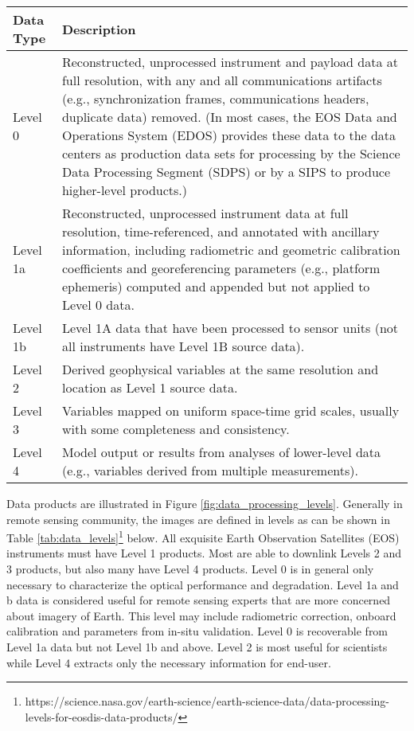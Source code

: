 \begin{table*}[htbp]
	\caption{Data Processing Levels}
	\label{tab:data_levels}
	\centering
		\begin{tabular}{|l |p{12cm}|}
			\hline 															
			Data Type & Description \\
			\hline
			Level 0 & Reconstructed, unprocessed instrument and payload data at full resolution, with any and all communications artifacts (e.g., synchronization frames, communications headers, duplicate data) removed. (In most cases, the EOS Data and Operations System (EDOS) provides these data to the data centers as production data sets for processing by the Science Data Processing Segment (SDPS) or by a SIPS to produce higher-level products.) \\
			\hline
			Level 1a & Reconstructed, unprocessed instrument data at full resolution, time-referenced, and annotated with ancillary information, including radiometric and geometric calibration coefficients and georeferencing parameters (e.g., platform ephemeris) computed and appended but not applied to Level 0 data. \\
			\hline
			Level 1b & Level 1A data that have been processed to sensor units (not all instruments have Level 1B source data). \\
			\hline
			Level 2 & Derived geophysical variables at the same resolution and location as Level 1 source data. \\
			\hline
			Level 3 & Variables mapped on uniform space-time grid scales, usually with some completeness and consistency. \\
			\hline
			Level 4 & Model output or results from analyses of lower-level data (e.g., variables derived from multiple measurements). \\
			\hline
		\end{tabular}
\end{table*}
Data products are illustrated in Figure \ref{fig:data_processing_levels}. Generally in remote sensing community, the images are defined in levels as can be shown in Table \ref{tab:data_levels}\footnote{https://science.nasa.gov/earth-science/earth-science-data/data-processing-levels-for-eosdis-data-products/} below. All exquisite Earth Observation Satellites (EOS) instruments must have Level 1 products. Most are able to downlink Levels 2 and 3 products, but also many have Level 4 products. Level 0 is in general only necessary to characterize the optical performance and degradation. Level 1a and b data is considered useful for remote sensing experts that are more concerned about imagery of Earth. This level may include radiometric correction, onboard calibration and parameters from in-situ validation. Level 0 is recoverable from Level 1a data but not Level 1b and above. Level 2 is most useful for scientists while Level 4 extracts only the necessary information for end-user.

